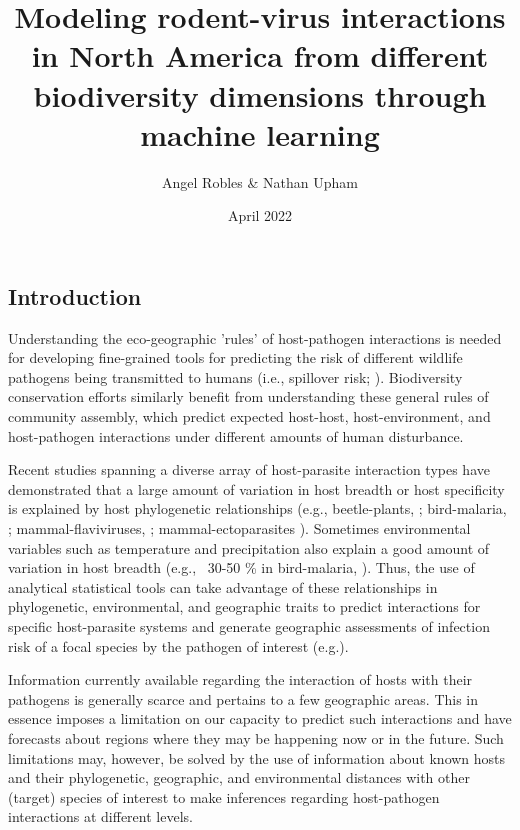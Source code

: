 \documentclass{article}
\title{Modeling rodent-virus interactions in North America from different biodiversity dimensions through machine learning}
\author{Angel Robles & Nathan Upham }
\date{April 2022}
\begin{document}
\maketitle
\subsection*{Introduction}
Understanding the eco-geographic 'rules' of host-pathogen interactions is needed for developing fine-grained tools for predicting the risk of different wildlife pathogens being transmitted to humans (i.e., spillover risk; \cite{gilbert2012evolutionary}). Biodiversity conservation efforts similarly benefit from understanding these general rules of community assembly, which predict expected host-host, host-environment, and host-pathogen interactions under different amounts of human disturbance.

Recent studies spanning a diverse array of host-parasite interaction types have demonstrated that a large amount of variation in host breadth or host specificity is explained by host phylogenetic relationships (e.g., beetle-plants, \cite{robles2017combining}; bird-malaria, \cite{clark2017integrating}; mammal-flaviviruses, \cite{sotomayor2019insights}; mammal-ectoparasites \cite{dattilo2020species}). Sometimes environmental variables such as temperature and precipitation also explain a good amount of variation in host breadth (e.g., ~30-50 \% in bird-malaria, \cite{fecchio2019climate}). Thus, the use of analytical statistical tools can take advantage of these relationships in phylogenetic, environmental, and geographic traits to predict interactions for specific host-parasite systems and generate geographic assessments of infection risk of a focal species by the pathogen of interest (e.g.\cite{robles2017combining}). 

Information currently available regarding the interaction of hosts with their pathogens is generally scarce and pertains to a few geographic areas. This in essence imposes a limitation on our capacity to predict such interactions and have forecasts about regions where they may be happening now or in the future. Such limitations may, however, be solved by the use of information about known hosts and their phylogenetic, geographic, and environmental distances with other (target) species of interest to make inferences regarding host-pathogen interactions at different levels.
\end{document}
